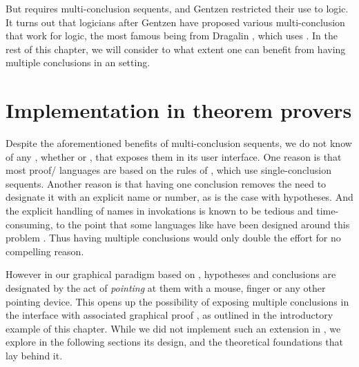 \begin{scope}
But {} requires multi-conclusion sequents, and Gentzen restricted
their use to  logic. It turns out that logicians after Gentzen have
proposed various multi-conclusion  that work for 
logic, the most famous being  from Dragalin
, which uses {}. In the rest of
this chapter, we will consider to what extent one can benefit from having
multiple conclusions in an  setting.

\section{Implementation in theorem provers}

\AP
Despite the aforementioned benefits of multi-conclusion sequents, we do not know
of any , whether  or , that
exposes them in its user interface. One reason is that most proof/
languages are based on the rules of , which use
single-conclusion sequents. Another reason is that having one conclusion removes
the need to designate it with an explicit name or number, as is the case with
hypotheses. And the explicit handling of names in 
invokations is known to be tedious and time-consuming, to the point that some
 languages like {\intro{\ssreflect}} have been designed around this problem
. Thus having multiple conclusions would only double the effort
for no compelling reason.

However in our graphical paradigm based on , hypotheses
and conclusions are designated by the act of \emph{pointing} at them with a
mouse, finger or any other pointing device. This opens up the
possibility of exposing multiple conclusions in the interface with associated
graphical proof , as outlined in the introductory example of this
chapter. While we did not implement such an extension in , we explore
in the following sections its design, and the theoretical foundations that lay
behind it.


\end{scope}
